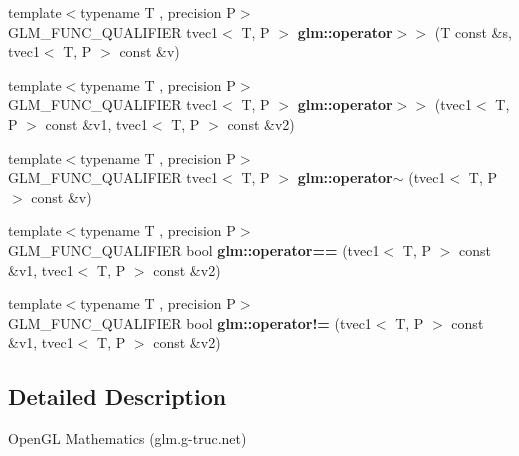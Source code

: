 \begin{DoxyCompactItemize}
\item 
\hypertarget{namespaceglm_ad290cca6f3c0d6e68b063011db33df00}{{\footnotesize template$<$typename T , precision P$>$ }\\G\-L\-M\-\_\-\-F\-U\-N\-C\-\_\-\-Q\-U\-A\-L\-I\-F\-I\-E\-R tvec1$<$ T, P $>$ {\bfseries glm\-::operator$>$$>$} (T const \&s, tvec1$<$ T, P $>$ const \&v)}\label{namespaceglm_ad290cca6f3c0d6e68b063011db33df00}

\item 
\hypertarget{namespaceglm_adbb2f50e95ea7aa74355eb231a305436}{{\footnotesize template$<$typename T , precision P$>$ }\\G\-L\-M\-\_\-\-F\-U\-N\-C\-\_\-\-Q\-U\-A\-L\-I\-F\-I\-E\-R tvec1$<$ T, P $>$ {\bfseries glm\-::operator$>$$>$} (tvec1$<$ T, P $>$ const \&v1, tvec1$<$ T, P $>$ const \&v2)}\label{namespaceglm_adbb2f50e95ea7aa74355eb231a305436}

\item 
\hypertarget{namespaceglm_abf218640e6cefd3d973d4cdce34795ff}{{\footnotesize template$<$typename T , precision P$>$ }\\G\-L\-M\-\_\-\-F\-U\-N\-C\-\_\-\-Q\-U\-A\-L\-I\-F\-I\-E\-R tvec1$<$ T, P $>$ {\bfseries glm\-::operator$\sim$} (tvec1$<$ T, P $>$ const \&v)}\label{namespaceglm_abf218640e6cefd3d973d4cdce34795ff}

\item 
\hypertarget{namespaceglm_a1903ed3e722222dd83e25a2f6a82782c}{{\footnotesize template$<$typename T , precision P$>$ }\\G\-L\-M\-\_\-\-F\-U\-N\-C\-\_\-\-Q\-U\-A\-L\-I\-F\-I\-E\-R bool {\bfseries glm\-::operator==} (tvec1$<$ T, P $>$ const \&v1, tvec1$<$ T, P $>$ const \&v2)}\label{namespaceglm_a1903ed3e722222dd83e25a2f6a82782c}

\item 
\hypertarget{namespaceglm_adbcfa5a99a45ab48706d1c04b364aad7}{{\footnotesize template$<$typename T , precision P$>$ }\\G\-L\-M\-\_\-\-F\-U\-N\-C\-\_\-\-Q\-U\-A\-L\-I\-F\-I\-E\-R bool {\bfseries glm\-::operator!=} (tvec1$<$ T, P $>$ const \&v1, tvec1$<$ T, P $>$ const \&v2)}\label{namespaceglm_adbcfa5a99a45ab48706d1c04b364aad7}

\end{DoxyCompactItemize}


\subsection{Detailed Description}
Open\-G\-L Mathematics (glm.\-g-\/truc.\-net)

